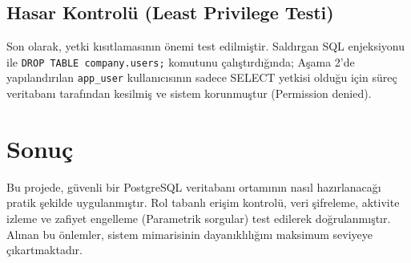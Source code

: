 \documentclass[12pt,a4paper]{article}
\begin{document}
\subsection{Hasar Kontrolü (Least Privilege Testi)}
Son olarak, yetki kısıtlamasının önemi test edilmiştir. Saldırgan SQL enjeksiyonu ile \texttt{DROP TABLE company.users;} komutunu çalıştırdığında; Aşama 2'de yapılandırılan \texttt{app\_user} kullanıcısının sadece SELECT yetkisi olduğu için süreç veritabanı tarafından kesilmiş ve sistem korunmuştur (Permission denied).

\section{Sonuç}
Bu projede, güvenli bir PostgreSQL veritabanı ortamının nasıl hazırlanacağı pratik şekilde uygulanmıştır. Rol tabanlı erişim kontrolü, veri şifreleme, aktivite izleme ve zafiyet engelleme (Parametrik sorgular) test edilerek doğrulanmıştır. Alınan bu önlemler, sistem mimarisinin dayanıklılığını maksimum seviyeye çıkartmaktadır.
\end{document}
